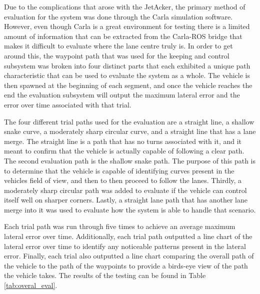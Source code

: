\documentclass[titlepage,draft]{article}
\begin{document}
{Due to the complications that arose with the JetAcker, the primary method of evaluation for the system was done through the Carla simulation software. However, even though Carla is a great environment for testing there is a limited amount of information that can be extracted from the Carla-ROS bridge that makes it difficult to evaluate where the lane centre truly is. In order to get around this, the waypoint path that was used for the keeping and control subsystem was broken into four distinct parts that each exhibited a unique path characteristic that can be used to evaluate the system as a whole. The vehicle is then spawned at the beginning of each segment, and once the vehicle reaches the end the evaluation subsystem will output the maximum lateral error and the error over time associated with that trial.

The four different trial paths used for the evaluation are a straight line, a shallow snake curve, a moderately sharp circular curve, and a straight line that has a lane merge. The straight line is a path that has no turns associated with it, and it meant to confirm that the vehicle is actually capable of following a clear path. The second evaluation path is the shallow snake path. The purpose of this path is to determine that the vehicle is capable of identifying curves present in the vehicles field of view, and then to then proceed to follow the lanes. Thirdly, a moderately sharp circular path was added to evaluate if the vehicle can control itself well on sharper corners. Lastly, a straight lane path that has another lane merge into it was used to evaluate how the system is able to handle that scenario.

Each trial path was run through five times to achieve an average maximum lateral error over time. Additionally, each trial path outputted a line chart of the lateral error over time to identify any noticeable patterns present in the lateral error. Finally, each trial also outputted a line chart comparing the overall path of the vehicle to the path of the waypoints to provide a birds-eye view of the path the vehicle takes. The results of the testing can be found in Table \ref{tab:overal_eval}.

}
\end{document}
